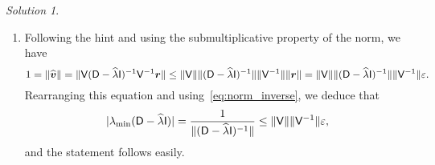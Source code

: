 \documentclass[11pt]{article}
\theoremstyle{definition}
\theoremstyle{remark}
\newtheorem*{solution}{Solution}
\begin{document}
\begin{solution}
\begin{enumerate}
        \item
            Following the hint and using the submultiplicative property of the norm,
            we have
            \[
                1 = \lVert\widehat {\mathbf{\boldsymbol{v}}}\rVert
                = \lVert\mathsf V (\mathsf D - \widehat \lambda \mathsf I)^{-1}  \mathsf V^{-1} {\mathbf{\boldsymbol{r}}}\rVert
                \leq \lVert\mathsf V\rVert \lVert(\mathsf D - \widehat \lambda \mathsf I)^{-1}\rVert \lVert\mathsf V^{-1}\rVert \lVert\mathbf{\boldsymbol{r}}\rVert
                = \lVert\mathsf V\rVert \lVert(\mathsf D - \widehat \lambda \mathsf I)^{-1}\rVert \lVert\mathsf V^{-1}\rVert \varepsilon.
            \]
            Rearranging this equation and using~\eqref{eq:norm_inverse},
            we deduce that
            \[
                \lvert\lambda_{\min} (\mathsf D - \widehat \lambda \mathsf I)\rvert
                = \frac{1}{\lVert(\mathsf D - \widehat \lambda \mathsf I)^{-1}\rVert}
                \leq \lVert\mathsf V\rVert \lVert\mathsf V^{-1}\rVert \varepsilon,
            \]
            and the statement follows easily.

    \end{enumerate}
\end{solution}
\end{document}
